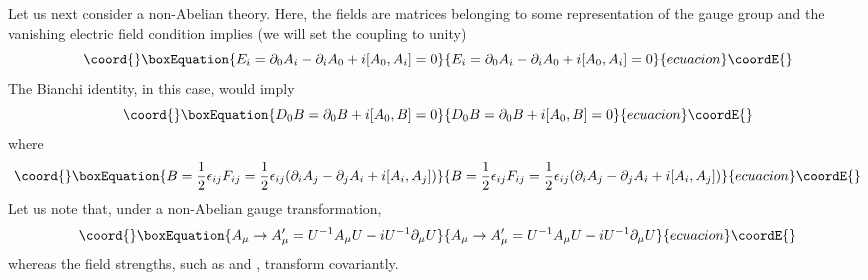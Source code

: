 \documentclass[a4paper,12pt]{article}
\begin{document}
Let us next consider a non-Abelian theory. Here, the fields are
matrices belonging to some representation of the gauge group and the
vanishing electric field condition implies (we will set the coupling
to unity)
\begin{equation}\coord{}\boxEquation{
E_{i} = \partial_{0}A_{i} - \partial_{i}A_{0} + i[A_{0}, A_{i}] = 0
}{
E_{i} = \partial_{0}A_{i} - \partial_{i}A_{0} + i[A_{0}, A_{i}] = 0
}{ecuacion}\coordE{}\end{equation}
The Bianchi identity, in this case, would imply
\begin{equation}\coord{}\boxEquation{
D_{0}B = \partial_{0}B + i[A_{0},B] = 0
}{
D_{0}B = \partial_{0}B + i[A_{0},B] = 0
}{ecuacion}\coordE{}\end{equation}
where
\begin{equation}\coord{}\boxEquation{
B = {1\over 2} \epsilon_{ij} F_{ij} = {1\over 2}
\epsilon_{ij}(\partial_{i}A_{j}  -
\partial_{j}A_{i} + i[A_{i},A_{j}]) 
}{
B = {1\over 2} \epsilon_{ij} F_{ij} = {1\over 2}
\epsilon_{ij}(\partial_{i}A_{j}  -
\partial_{j}A_{i} + i[A_{i},A_{j}]) 
}{ecuacion}\coordE{}\end{equation}
Let us note that, under a non-Abelian gauge transformation,
\begin{equation}\coord{}\boxEquation{
A_{\mu}\rightarrow A'_{\mu} = U^{-1}A_{\mu}U - iU^{-1}\partial_{\mu}U
}{
A_{\mu}\rightarrow A'_{\mu} = U^{-1}A_{\mu}U - iU^{-1}\partial_{\mu}U
}{ecuacion}\coordE{}\end{equation}
whereas the field strengths, such as \coordHE{} and \coordHE{}, transform covariantly.
\end{document}
